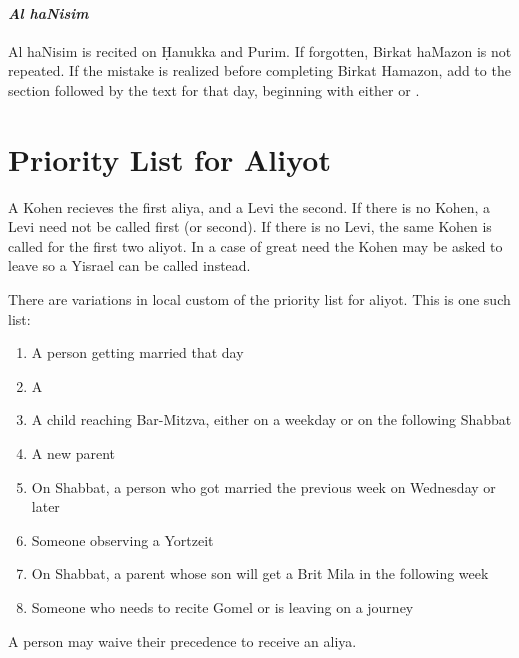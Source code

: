 \paragraph{\textit{Al haNisim}}

Al haNisim is recited on \d{H}anukka and Purim.  If forgotten, Birkat haMazon is not repeated.  If the mistake is realized before completing Birkat Hamazon, add to the  section  followed by the text for that day, beginning with either  or  \parencite*[44:16]{Kitzur}.

\section{Priority List for Aliyot}

A Kohen recieves the first aliya, and a Levi the second.  If there is no Kohen, a Levi need not be called first (or second).  If there is no Levi, the same Kohen is called for the first two aliyot.  In a case of great need the Kohen may be asked to leave so a Yisrael can be called instead.

There are variations in local custom of the priority list for aliyot.  This is one such list\parencite*[78:11]{Kitzur}:\begin{enumerate}
		\item A person getting married that day
		\item A 
		\item A child reaching Bar-Mitzva, either on a weekday or on the following Shabbat
		\item A new parent
		\item On Shabbat, a person who got married the previous week on Wednesday or later
		\item Someone observing a Yortzeit
		\item On Shabbat, a parent whose son will get a Brit Mila in the following week
		\item Someone who needs to recite Gomel or is leaving on a journey
	\end{enumerate}
	
	A person may waive their precedence to receive an aliya.
